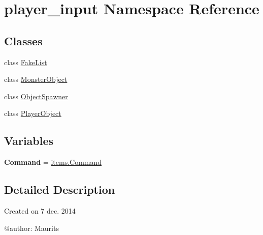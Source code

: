 \hypertarget{namespaceplayer__input}{}\section{player\+\_\+input Namespace Reference}
\label{namespaceplayer__input}
\subsection*{Classes}
\begin{DoxyCompactItemize}
\item 
class \hyperlink{classplayer__input_1_1_fake_list}{Fake\+List}
\item 
class \hyperlink{classplayer__input_1_1_monster_object}{Monster\+Object}
\item 
class \hyperlink{classplayer__input_1_1_object_spawner}{Object\+Spawner}
\item 
class \hyperlink{classplayer__input_1_1_player_object}{Player\+Object}
\end{DoxyCompactItemize}
\subsection*{Variables}
\begin{DoxyCompactItemize}
\item 
\hypertarget{namespaceplayer__input_aa3608c2acee9f2fe09c58b8bcf9bd3d5}{}{\bfseries Command} = \hyperlink{classitems_1_1_command}{items.\+Command}\label{namespaceplayer__input_aa3608c2acee9f2fe09c58b8bcf9bd3d5}

\end{DoxyCompactItemize}


\subsection{Detailed Description}
\begin{DoxyVerb}Created on 7 dec. 2014

@author: Maurits
\end{DoxyVerb}
 